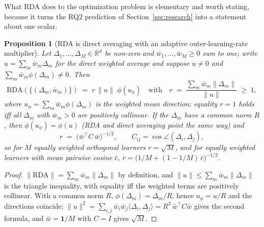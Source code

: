 \documentclass[11pt,a4paper]{article}
\newtheorem{proposition}[theorem]{Proposition}
\begin{document}
What RDA does to the optimization problem is elementary and worth stating, because it turns the RQ2 prediction of Section~\ref{sec:research} into a statement about one scalar.
\begin{proposition}[RDA is direct averaging with an adaptive outer-learning-rate multiplier]
\label{prop:rda_multiplier}
Let $\Delta_1,\dots,\Delta_M \in \mathbb{R}^d$ be non-zero and $\bar w_1,\dots,\bar w_M \ge 0$ sum to one; write $u = \sum_m \bar w_m \Delta_m$ for the direct weighted average and suppose $u \ne 0$ and $\sum_m \bar w_m \phi(\Delta_m) \neq 0$. Then
\begin{equation}
\mathrm{RDA}(\{(\Delta_m,\bar w_m)\}) \;=\; r\,\|u\|\;\phi(u_\phi) \quad\text{with}\quad r \;=\; \frac{\sum_m \bar w_m \|\Delta_m\|}{\|u\|} \;\ge\; 1,
\end{equation}
where $u_\phi = \sum_m \bar w_m \phi(\Delta_m)$ is the weighted mean \emph{direction}; equality $r = 1$ holds iff all $\Delta_m$ with $\bar w_m > 0$ are positively collinear. If the $\Delta_m$ have a common norm $R$, then $\phi(u_\phi) = \phi(u)$ (RDA and direct averaging point the same way) and
\begin{equation}
r \;=\; \big(\bar w^{\top} C\,\bar w\big)^{-1/2}, \qquad C_{ij} = \cos\angle(\Delta_i,\Delta_j),
\end{equation}
so for $M$ equally weighted orthogonal learners $r = \sqrt{M}$, and for equally weighted learners with mean pairwise cosine $\bar c$, $r = \big(1/M + (1-1/M)\,\bar c\big)^{-1/2}$.
\end{proposition}
\begin{proof}
$\|\mathrm{RDA}\| = \sum_m \bar w_m \|\Delta_m\|$ by definition, and $\|u\| \le \sum_m \bar w_m \|\Delta_m\|$ is the triangle inequality, with equality iff the weighted terms are positively collinear. With a common norm $R$, $\phi(\Delta_m) = \Delta_m / R$, hence $u_\phi = u/R$ and the directions coincide; $\|u\|^2 = \sum_{i,j} \bar w_i \bar w_j \langle \Delta_i, \Delta_j \rangle = R^2\, \bar w^{\top} C \bar w$ gives the second formula, and $\bar w = \mathbf{1}/M$ with $C = I$ gives $\sqrt{M}$.
\end{proof}
\end{document}
